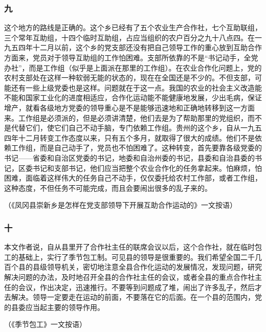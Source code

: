 \documentclass[cn,11pt,chinese]{elegantbook}
\def\myformat#1{\hfil\hfil #1}
\begin{document}
\subsubsection*{\myformat{九}}
这个地方的路线是正确的。这个乡已经有了五个农业生产合作社，七个互助联组，三个常年互助组，十四个临时互助组，占应当组织的农户百分之九十八点四。在一九五四年十二月以前，这个乡的党支部还没有把自己领导工作的重心放到互助合作方面来，党员对于领导互助组的工作怕困难。支部所依靠的不是“书记动手，全党办社”，而是工作组（似乎是上面派在那里的工作组）。在农业合作化问题上，党的农村支部处在这样一种软弱无能的状态的，现在在全国还是不少的。不但支部，可能还有一些上级党委也是这样。问题就在于这一点。我国的农业的社会主义改造能不能和国家工业化的进度相适应，合作化运动能不能健康地发展，少出毛病，保证增产，就看各级地方党委的领导重心是不是能够迅速地和正确地转移到这一方面来。工作组是必须派的，但是必须讲清楚，他们去是为了帮助那里的党组织，而不是代替它们，使它们自己不动手脑，专门依赖工作组。贵州的这个乡，自从一九五四年十二月转变工作态度以来，只有五个多月，就取得了很大的成绩。他们不是依赖工作组，而是自己动手了，党员也不怕困难了。这种转变，首先要靠各级党委的书记——省委和自治区党委的书记，地委和自治州委的书记，县委和自治县委的书记，区委书记和支部书记，他们应当把整个农业合作化的任务拿起来。怕麻烦，怕困难，面临着这样伟大的任务自己不动手，仅仅委托给农村工作部，或者工作组，这种态度，不但任务不可能完成，而且会要闹出很多的乱子来的。\\
\begin{flushright}（《凤冈县崇新乡是怎样在党支部领导下开展互助合作运动的》一文按语）\end{flushright}
\subsubsection*{\myformat{十}}
本文作者说，自从县里开了合作社主任的联席会议以后，这个合作社，就在临时包工的基础上，实行了季节包工制。可见县的领导是很重要的。我们希望全国二千几百个县的县级领导机关，密切地注意全县合作化运动的发展情况，发现问题，研究解决问题的办法，及时地召开全县的合作社主任的会议，或者全县的重点合作社主任的会议，作出决定，迅速推行。不要等到问题成了堆，闹出了许多乱子，然后才去解决。领导一定要走在运动的前面，不要落在它的后面。在一个县的范围内，党的县委应当起主要的领导作用。\\
\begin{flushright}（《季节包工》一文按语）\end{flushright}
\end{document}
